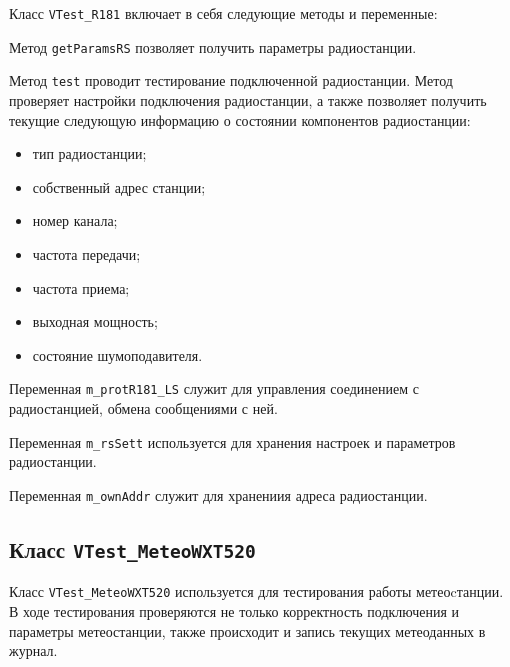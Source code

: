 Класс \texttt{VTest\_R181} включает в себя следующие методы и переменные:
\begin{enum}
	\item Метод \texttt{getParamsRS} позволяет получить параметры радиостанции.

	\item Метод \texttt{test} проводит тестирование подключенной радиостанции. Метод проверяет настройки подключения
		радиостанции, а также позволяет получить текущие следующую информацию о состоянии компонентов
		радиостанции:
		\begin{itemize}
			\item тип радиостанции;
			\item собственный адрес станции;
			\item номер канала;
			\item частота передачи;
			\item частота приема;
			\item выходная мощность;
			\item состояние шумоподавителя.
		\end{itemize}

	\item Переменная \texttt{m\_protR181\_LS} служит для управления соединением с радиостанцией, обмена сообщениями
		с ней.

	\item Переменная \texttt{m\_rsSett} используется для хранения настроек и параметров радиостанции.

	\item Переменная \texttt{m\_ownAddr} служит для хранениия адреса радиостанции.
\end{enum}

\subsection{Класс \texttt{VTest\_MeteoWXT520}}
Класс \texttt{VTest\_MeteoWXT520} используется для тестирования работы метеоcтанции. В ходе тестирования проверяются не
только корректность подключения и параметры метеостанции, также происходит и запись текущих метеоданных в журнал.

